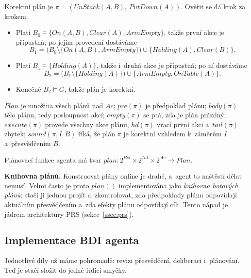 \documentclass[11pt,a4paper]{article}
\theoremstyle{definition}
\begin{document}
\noindent Korektní plán je $\pi = (\mathit{UnStack}(A,B),\ \mathit{PutDown}(A))$. Ověřit se dá
krok za krokem:
\begin{itemize}
\item Platí $B_0 \models \{\mathit{On}(A,B),\mathit{Clear}(A),\mathit{ArmEmpty}\}$, takže první
  akce je přípustná; po jejím provedení dostáváme
  \[
  B_1 = \big(B_0 \setminus \{\mathit{On}(A,B),\mathit{ArmEmpty}\}\big) \cup
  \{\mathit{Holding}(A),\mathit{Clear}(B)\}.
  \]
\item Platí $B_1 \models \{\mathit{Holding}(A)\}$, takže i~druhá akce je přípustná; po ní
  dostáváme
  \[
  B_2 = \big(B_1 \setminus \{\mathit{Holding}(A)\}\big) \cup
  \{\mathit{ArmEmpty},\mathit{OnTable}(A)\}.
  \]
\item Konečně $B_2 \models G$, takže plán je korektní.
\end{itemize}

\begin{defbox}
$\mathit{Plan}$ je množina všech plánů nad $\mathit{Ac}$;
$\mathit{pre}(\pi)$ je předpoklad plánu; $\mathit{body}(\pi)$ tělo plánu, tedy posloupnost akcí;
$\mathit{empty}(\pi)$ se ptá, zda je plán prázdný;
$\mathit{execute}(\pi)$ provede všechny akce plánu;
$\mathit{hd}(\pi)$ vrací první akci a~$\mathit{tail}(\pi)$ zbytek;
$\mathit{sound}(\pi,I,B)$ říká, že plán $\pi$ je korektní vzhledem k~záměrům $I$
a~přesvědčením $B$.

Plánovací funkce agenta má tvar
$\mathit{plan} : 2^{\mathit{Bel}} \times 2^{\mathit{Int}} \times 2^{\mathit{Ac}} \to \mathit{Plan}$.
\end{defbox}

\textbf{Knihovna plánů.} Konstruovat plány online je drahé, a~agent to naštěstí dělat nemusí.
Velmi často je proto $\mathit{plan}()$ implementována jako \emph{knihovna hotových plánů}:
stačí ji jednou projít a~zkontrolovat, zda předpoklady plánu odpovídají aktuálním přesvědčením
a~zda efekty plánu odpovídají cíli. Tento nápad je jádrem architektury PRS (sekce~\ref{ssec:prs}).

\subsection{Implementace BDI agenta}

Jednotlivé díly už máme pohromadě: revizi přesvědčení, deliberaci i~plánování. Teď je stačí složit
do jedné řídicí smyčky.
\end{document}
